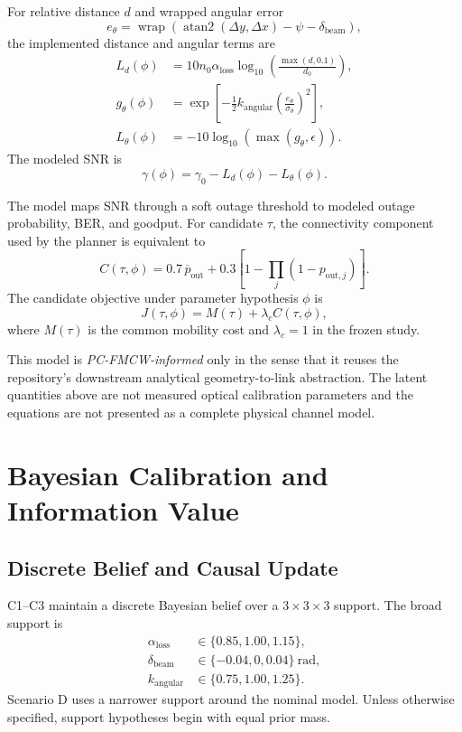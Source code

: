 \documentclass[journal]{IEEEtran}
\begin{document}
For relative distance $d$ and wrapped angular error
\begin{equation}
e_\theta=\operatorname{wrap}\!\left(
\operatorname{atan2}(\Delta y,\Delta x)-\psi-\delta_{\mathrm{beam}}
\right),
\end{equation}
the implemented distance and angular terms are
\begin{align}
L_d(\phi)
&=10n_0\alpha_{\mathrm{loss}}
\log_{10}\!\left(\frac{\max(d,0.1)}{d_0}\right),\\
g_\theta(\phi)
&=\exp\!\left[-\frac{1}{2}k_{\mathrm{angular}}
\left(\frac{e_\theta}{\sigma_\theta}\right)^2\right],\\
L_\theta(\phi)
&=-10\log_{10}\!\left(\max(g_\theta,\epsilon)\right).
\end{align}
The modeled SNR is
\begin{equation}
\gamma(\phi)=\gamma_0-L_d(\phi)-L_\theta(\phi).
\end{equation}

The model maps SNR through a soft outage threshold to modeled outage probability, BER, and goodput. For candidate $\tau$, the connectivity component used by the planner is equivalent to
\begin{equation}
C(\tau,\phi)
=
0.7\,\overline{p}_{\mathrm{out}}
+
0.3\left[1-\prod_j(1-p_{\mathrm{out},j})\right].
\end{equation}
The candidate objective under parameter hypothesis $\phi$ is
\begin{equation}
J(\tau,\phi)=M(\tau)+\lambda_c C(\tau,\phi),
\end{equation}
where $M(\tau)$ is the common mobility cost and $\lambda_c=1$ in the frozen study.

This model is \emph{PC-FMCW-informed} only in the sense that it reuses the repository's downstream analytical geometry-to-link abstraction. The latent quantities above are not measured optical calibration parameters and the equations are not presented as a complete physical channel model.

\section{Bayesian Calibration and Information Value}
\subsection{Discrete Belief and Causal Update}
C1--C3 maintain a discrete Bayesian belief over a $3\times3\times3$ support. The broad support is
\begin{align}
\alpha_{\mathrm{loss}}&\in\{0.85,1.00,1.15\},\\
\delta_{\mathrm{beam}}&\in\{-0.04,0,0.04\}\ \mathrm{rad},\\
k_{\mathrm{angular}}&\in\{0.75,1.00,1.25\}.
\end{align}
Scenario D uses a narrower support around the nominal model. Unless otherwise specified, support hypotheses begin with equal prior mass.
\end{document}

